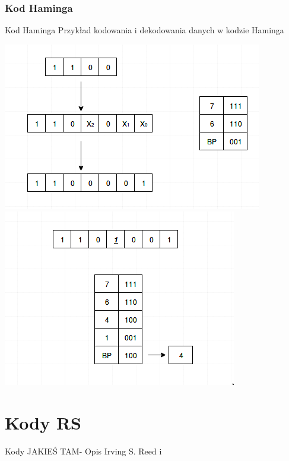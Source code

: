 \documentclass[12pt]{beamer}
\begin{document}
\subsubsection{Kod Haminga}
\begin{frame}{Kod Haminga}
Przykład kodowania i dekodowania danych w kodzie Haminga
\begin{center}
\includegraphics[scale= 0.30]{Haming/Kodowanie_Haming.png}
\includegraphics[scale=0.30]{Haming/Dekodowanie_Haming.png}
\end{center}
\end{frame}

	

\section{Kody RS}
\begin{frame}{Kody JAKIEŚ TAM- Opis}
\setcounter{section}{1}
Irving S. Reed i 

\end{frame}

\end{document}

